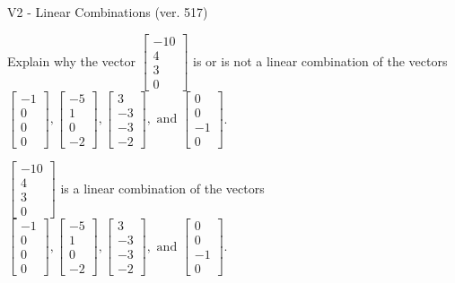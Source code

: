 \begin{exercise}
  \begin{exerciseTitle}V2 - Linear Combinations (ver. 517)\end{exerciseTitle}
  \begin{exerciseStatement}
    Explain why the vector \(\left[\begin{array}{c}
-10 \\
4 \\
3 \\
0
\end{array}\right]\)  is or is not a linear 
	combination of the vectors \(\left[\begin{array}{c}
-1 \\
0 \\
0 \\
0
\end{array}\right] , \left[\begin{array}{c}
-5 \\
1 \\
0 \\
-2
\end{array}\right] , \left[\begin{array}{c}
3 \\
-3 \\
-3 \\
-2
\end{array}\right] , \text{ and } \left[\begin{array}{c}
0 \\
0 \\
-1 \\
0
\end{array}\right]\).
	


  \end{exerciseStatement}
  \begin{exerciseAnswer}
   \(\left[\begin{array}{c}
-10 \\
4 \\
3 \\
0
\end{array}\right]\) 
  	 is  
	a linear combination of the vectors \(\left[\begin{array}{c}
-1 \\
0 \\
0 \\
0
\end{array}\right] , \left[\begin{array}{c}
-5 \\
1 \\
0 \\
-2
\end{array}\right] , \left[\begin{array}{c}
3 \\
-3 \\
-3 \\
-2
\end{array}\right] , \text{ and } \left[\begin{array}{c}
0 \\
0 \\
-1 \\
0
\end{array}\right]\).


\end{exerciseAnswer}
\end{exercise}
